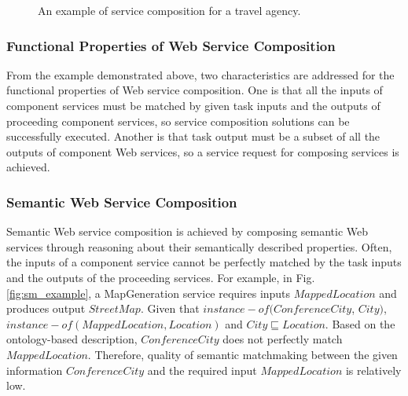 \begin{figure}
\centerline{
}
\caption{An example of service composition for a travel agency.}
\label{fig:wsc_example}
\end{figure}

\subsubsection{Functional Properties of Web Service Composition}
From the example demonstrated above, two characteristics are addressed for the functional properties of Web service composition. One is that all the inputs of component services must be matched by given task inputs and the outputs of proceeding component services, so  service composition solutions can be successfully executed. Another is that task output must be a subset of all the outputs of component Web services, so a service request for composing services is achieved. 


\subsubsection{Semantic Web Service Composition}

Semantic Web service composition is achieved by composing semantic Web services through reasoning about their semantically described properties. Often, the inputs of a component service cannot be perfectly matched by the task inputs and the outputs of the proceeding services. For example, in Fig. \ref{fig:sm_example}, a MapGeneration service requires inputs $MappedLocation$ and produces output $StreetMap$. Given that $instance-of (ConferenceCity$, $City)$, $instance-of (MappedLocation, Location)$ and $City \sqsubseteq Location$. Based on the ontology-based description, $ConferenceCity$ does not perfectly match $MappedLocation$. Therefore, quality of semantic matchmaking between the given information $ConferenceCity$ and the required input $MappedLocation$ is relatively low. 

